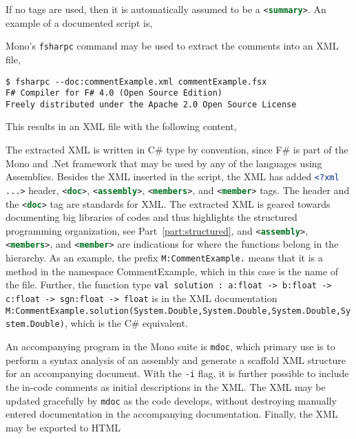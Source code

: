 If no tags are used, then it is automatically assumed to be a \lstinline[language=xml]!<summary>!. An example of a documented script is,
 
Mono's \lstinline[language=console]{fsharpc} command may be used to extract the comments into an XML file,
\begin{lstlisting}[language=console]
$ fsharpc --doc:commentExample.xml commentExample.fsx 
F# Compiler for F# 4.0 (Open Source Edition)
Freely distributed under the Apache 2.0 Open Source License
\end{lstlisting}
This results in an XML file with the following content,

The extracted XML is written in C\# type by convention, since F\# is part of the Mono and .Net framework that may be used by any of the languages using Assemblies. Besides the XML inserted in the script, the XML has added \lstinline[language=xml]!<?xml ...>! header, \lstinline[language=xml]!<doc>!, \lstinline[language=xml]!<assembly>!, \lstinline[language=xml]!<members>!, and \lstinline[language=xml]!<member>! tags. The header and the  \lstinline[language=xml]!<doc>! tag are standards for XML. The extracted XML is geared towards documenting big libraries of codes and thus highlights the structured programming organization, see Part~\ref{part:structured}, and \lstinline[language=xml]!<assembly>!, \lstinline[language=xml]!<members>!, and \lstinline[language=xml]!<member>! are indications for where the functions belong in the hierarchy. As an example, the prefix \lstinline[language=xml]!M:CommentExample.! means that it is a method in the namespace CommentExample, which in this case is the name of the file. Further, the function type \lstinline!val solution : a:float -> b:float -> c:float -> sgn:float -> float! is in the XML documentation \lstinline[language=xml]!M:CommentExample.solution(System.Double,System.Double,System.Double,System.Double)!, which is the C\# equivalent.

An accompanying program in the Mono suite is \lstinline[language=console]!mdoc!, which primary use is to perform a syntax analysis of an assembly and generate a scaffold XML structure for an accompanying document. With the \lstinline[language=console]!-i! flag, it is further possible to include the in-code comments as initial descriptions in the XML. The XML may be updated gracefully by \lstinline[language=console]!mdoc! as the code develops, without destroying manually entered documentation in the accompanying documentation. Finally, the XML may be exported to HTML

